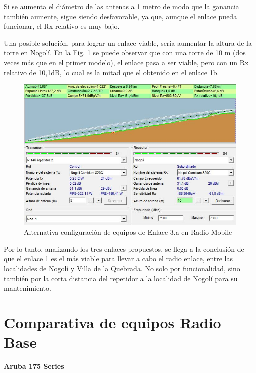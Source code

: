 \documentclass[12pt,a4paper]{book}
\begin{document}
Si se aumenta el diámetro de las antenas a 1 metro de modo que la ganancia también aumente, sigue siendo desfavorable, ya que, aunque el enlace pueda funcionar, el Rx relativo es muy bajo.

Una posible solución, para lograr un enlace viable, sería aumentar la altura de la torre en Nogolí. En la Fig. \ref{fig_red_transporte_13} se puede observar que con una torre de 10 m (dos veces más que en el primer modelo), el enlace pasa a ser viable, pero con un Rx relativo de 10,1dB, lo cual es la mitad que el obtenido en el enlace 1b.

\begin{figure} [H]
\centering
\includegraphics[width= 12 cm]{../figuras/red_transporte_13.jpg}
\caption{Alternativa configuración de equipos de Enlace 3.a en Radio Mobile}
\label{fig_red_transporte_13}
\end{figure}

Por lo tanto, analizando los tres enlaces propuestos, se llega a la conclusión de que el enlace 1 es el más viable para llevar a cabo el radio enlace, entre las localidades de Nogolí y Villa de la Quebrada. No solo por funcionalidad, sino también por la corta distancia del repetidor a la localidad de Nogolí para su mantenimiento.






\chapter{Comparativa de equipos Radio Base} \label{ane_comp_equipos_Radio_red_acceso}
\begin{large}
\noindent \textbf{Aruba 175 Series}
\end{large}
 

\medskip
\end{document}
